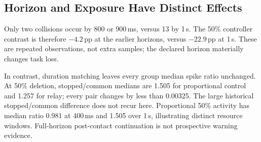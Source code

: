 \subsection{Horizon and Exposure Have Distinct Effects}
Only two collisions occur by 800 or 900\,ms, versus 13 by 1\,s. The 50\% controller contrast is therefore $-4.2$\,pp at the earlier horizons, versus $-22.9$\,pp at 1\,s. These are repeated observations, not extra samples; the declared horizon materially changes task loss.

In contrast, duration matching leaves every group median spike ratio unchanged. At 50\% deletion, stopped/common medians are 1.505 for proportional control and 1.257 for relay; every pair changes by less than 0.00325. The large historical stopped/common difference does not recur here. Proportional 50\% activity has median ratio 0.981 at 400\,ms and 1.505 over 1\,s, illustrating distinct resource windows. Full-horizon post-contact continuation is not prospective warning evidence.
